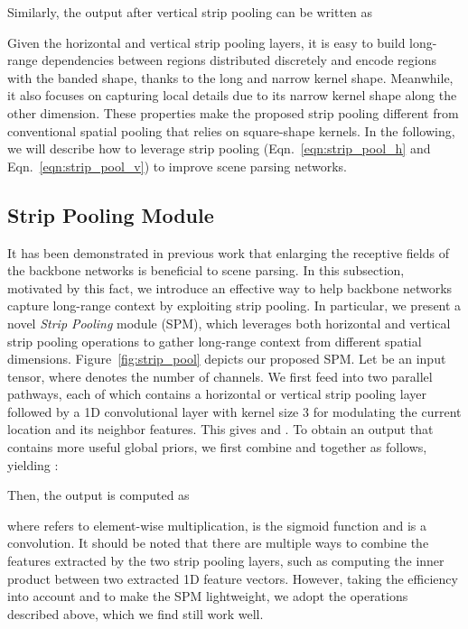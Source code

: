 \documentclass[final]{cvpr}
\begin{document}
Similarly, the output  after vertical strip pooling can be written as

Given the horizontal and vertical strip pooling layers, it is easy to build long-range dependencies between regions distributed discretely and encode regions with the banded shape, thanks to the long and narrow kernel shape. 
Meanwhile, it also focuses on capturing local details due to its narrow kernel shape along 
the other dimension.
These properties make the proposed strip pooling different from conventional spatial pooling that relies on square-shape kernels.
In the following, we will describe how to leverage strip pooling (Eqn.~\ref{eqn:strip_pool_h} and Eqn.~\ref{eqn:strip_pool_v}) to improve scene parsing networks.

\subsection{Strip Pooling Module} \label{sec:sp_block}

It has been demonstrated in previous work \cite{chen2018encoder,fu2019dual} that enlarging the receptive fields of the backbone networks is beneficial to scene parsing.
In this subsection, motivated by this fact,
we introduce an effective way to help backbone networks capture long-range context by exploiting strip pooling.
In particular, we present a novel \emph{Strip Pooling} module (SPM), which leverages both horizontal and vertical strip pooling operations to gather long-range context from different
spatial dimensions.
Figure~\ref{fig:strip_pool} depicts our proposed
SPM.
Let  be an input tensor, where  denotes the number of channels.
We first feed  into two parallel pathways, each of which contains a horizontal or vertical strip pooling layer 
followed by a 1D convolutional layer with kernel size 3 for modulating the current location and its neighbor features. 
This gives  and .
To obtain an output  that contains more useful global priors, we first combine   and  together as follows, yielding 
:

Then, the output  is computed as

where  refers to element-wise multiplication,  is the sigmoid function and  is a  convolution.
It should be noted that there are multiple ways to combine the features extracted by the two strip pooling layers, such as computing the inner product between two extracted 1D feature vectors.
However, taking the efficiency into account and to make the SPM lightweight, we adopt the operations described above, which we find still work well.
\end{document}
